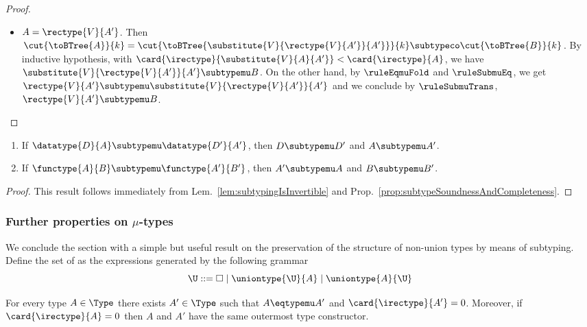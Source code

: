 \begin{proof}
\begin{itemize}
  \item $A = \rectype{V}{A'}$. Then $\cut{\toBTree{A}}{k} =
  \cut{\toBTree{\substitute{V}{\rectype{V}{A'}}{A'}}}{k} \subtypeco
  \cut{\toBTree{B}}{k}$. By inductive hypothesis, with
  $\card{\irectype}{\substitute{V}{A}{A'}} < \card{\irectype}{A}$, we have
  $\substitute{V}{\rectype{V}{A'}}{A'} \subtypemu B$. On the other hand, by
  $\ruleEqmuFold$ and $\ruleSubmuEq$, we get $\rectype{V}{A'} \subtypemu
  \substitute{V}{\rectype{V}{A'}}{A'}$ and we conclude by $\ruleSubmuTrans$,
  $\rectype{V}{A'} \subtypemu B$.
\end{itemize}
\end{proof}



\begin{proposition}
\label{prop:subtypingIsInvertible}
\begin{enumerate}
  \item If $\datatype{D}{A} \subtypemu \datatype{D'}{A'}$, then $D \subtypemu
  D'$ and $A \subtypemu A'$.
  
  \item If $\functype{A}{B} \subtypemu \functype{A'}{B'}$, then $A' \subtypemu
  A$ and $B \subtypemu B'$.
\end{enumerate}
\end{proposition}

\begin{proof}
This result follows immediately from Lem.~\ref{lem:subtypingIsInvertible} and
Prop.~\ref{prop:subtypeSoundnessAndCompleteness}.
\end{proof}



\subsubsection{Further properties on \texorpdfstring{$\mu$}{u}-types}


We conclude the section with a simple but useful result on the preservation of
the structure of non-union types by means of subtyping. Define the set of
 as the expressions generated by the following grammar
$$\U ::= \Box \mathrel| \uniontype{\U}{A} \mathrel| \uniontype{A}{\U}$$

\begin{lemma}
\label{lem:noMuOnHeadPosition}
For every type $A \in \Type$ there exists $A' \in \Type$ such that $A \eqtypemu
A'$ and $\card{\irectype}{A'} = 0$. Moreover, if $\card{\irectype}{A} = 0$ then
$A$ and $A'$ have the same outermost type constructor.
\end{lemma}


